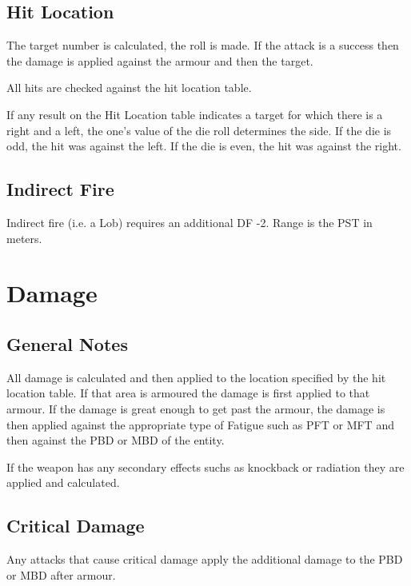 

\subsection{Hit Location}

The target number is calculated, the roll is made. If the attack
is a success then the damage is applied against the armour and then
the target.

All hits are checked against the hit location table.



If any result on the Hit Location table indicates a target for which there 
is a right and a left, the one's value of the die roll determines the side.
If the die is odd, the hit was against the left. If the die is even, the hit
was against the right.

\subsection{Indirect Fire}

Indirect fire (i.e. a Lob) requires an additional DF -2. Range is the 
PST in meters.

\section{Damage}

\subsection{General Notes}

All damage is calculated and then applied to the location specified 
by the hit location table. If that area is armoured the damage is 
first applied to that armour. If the damage is great enough to get 
past the armour, the damage is then applied against the 
appropriate type of Fatigue such as PFT or MFT and then against the 
PBD or MBD of the entity. 

If the weapon has any secondary effects suchs as knockback or radiation
they are applied and calculated. 

\subsection{Critical Damage}

Any attacks that cause critical damage apply the additional damage to 
the PBD or MBD after armour.

